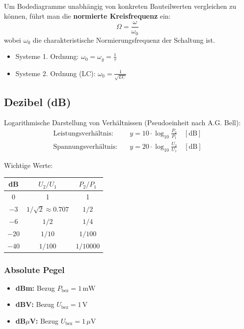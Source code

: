\documentclass[a4paper,12pt]{article}
\begin{document}
	Um Bodediagramme unabhängig von konkreten Bauteilwerten vergleichen zu können,
	führt man die \textbf{normierte Kreisfrequenz} ein:
	\begin{equation}
		\Omega = \frac{\omega}{\omega_0}
	\end{equation}
	wobei $\omega_0$ die charakteristische Normierungsfrequenz der Schaltung ist.
	\begin{itemize}
		\item Systeme 1. Ordnung: $\omega_0 = \omega_g = \frac{1}{\tau}$
		\item Systeme 2. Ordnung (LC): $\omega_0 = \frac{1}{\sqrt{LC}}$
	\end{itemize}
	
	\subsection{Dezibel (dB)}
	
	Logarithmische Darstellung von Verhältnissen (Pseudoeinheit nach A.G. Bell):
	\begin{align}
		\text{Leistungsverhältnis:} & \quad y = 10 \cdot \log_{10}\frac{P_2}{P_1} \quad [\text{dB}] \\
		\text{Spannungsverhältnis:} & \quad y = 20 \cdot \log_{10}\frac{U_2}{U_1} \quad [\text{dB}]
	\end{align}
	
	Wichtige Werte:
	\begin{center}
		\begin{tabular}{ccc}
			\hline
			dB & $U_2/U_1$ & $P_2/P_1$ \\
			\hline
			0    & 1          & 1       \\
			$-3$ & $1/\sqrt{2} \approx 0.707$ & $1/2$ \\
			$-6$ & $1/2$      & $1/4$   \\
			$-20$& $1/10$     & $1/100$ \\
			$-40$& $1/100$    & $1/10000$ \\
			\hline
		\end{tabular}
	\end{center}
	
	\subsubsection*{Absolute Pegel}
	\begin{itemize}
		\item \textbf{dBm:} Bezug $P_\text{bez} = 1\,\text{mW}$
		\item \textbf{dBV:} Bezug $U_\text{bez} = 1\,\text{V}$
		\item \textbf{dB$\mu$V:} Bezug $U_\text{bez} = 1\,\mu\text{V}$
	\end{itemize}
	
\end{document}
